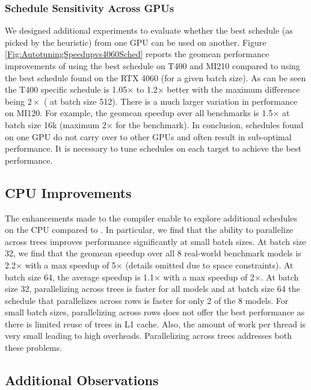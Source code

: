 \subsubsection*{Schedule Sensitivity Across GPUs}
We designed additional experiments to evaluate whether the best schedule (as picked by the heuristic) from one GPU can be used on another.
Figure \ref{Fig:AutotuningSpeedupvs4060Sched} reports the geomean performance improvements of using the best schedule on T400 and MI210 compared to using the best schedule found on the RTX 4060 (for a given batch size).
As can be seen the T400 specific schedule is 1.05$\times$ to 1.2$\times$ better 
with the maximum difference being $2\times$ ( at batch size 512).
There is a much larger variation in performance on MI120. For example, 
the geomean speedup over all benchmarks is 1.5$\times$ at batch size 16k (maximum 2$\times$ for the  benchmark).
In conclusion, schedules found on one GPU do not carry over to other GPUs and often result in sub-optimal performance.
It is necessary to tune schedules on each target to achieve the best performance.

\subsection{CPU Improvements}
The enhancements made to the compiler enable \Treebeard{} to explore additional schedules on the CPU
compared to \TreebeardOLD{}. 
In particular, we find that the ability to parallelize across trees improves performance 
significantly at small batch sizes. At batch size 32, we find that the geomean speedup over 
all 8 real-world benchmark models is 2.2$\times$ with a max speedup of 5$\times$ (details omitted 
due to space constraints). At batch size 64, the average speedup
is 1.1$\times$ with a max speedup of 2$\times$. At batch size 32, parallelizing across trees is faster 
for all models and at batch size 64 the \TreebeardOLD{} schedule that parallelizes across 
rows is faster for only 2 of the 8 models. For small batch sizes, parallelizing across rows does 
not offer the best performance as there is limited reuse of trees in L1 cache.
Also, the amount of work per thread is very small leading to high overheads. 
Parallelizing across trees addresses both these problems. 

\subsection{Additional Observations}
